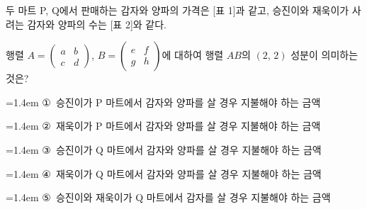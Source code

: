 \hspace*{2mm}\begin{minipage}[t]{\dimexpr\linewidth-2mm\relax}\vspace{0pt}
두 마트 P, Q에서 판매하는 감자와 양파의 가격은 [표 1]과 같고, 승진이와 재욱이가 사려는 감자와 양파의 수는 [표 2]와 같다. \par\smallskip\dispeq{}\par\smallskip\noindent 행렬 $A=\begin{pmatrix} a & b \\ c & d \end{pmatrix}$, $B=\begin{pmatrix} e & f \\ g & h \end{pmatrix}$에 대하여 행렬 $AB$의 $(2,\,2)$ 성분이 의미하는 것은?
\par\medskip\par\noindent\hangindent=1.4em {\small ①}\ 승진이가 P 마트에서 감자와 양파를 살 경우 지불해야 하는 금액\par\noindent\hangindent=1.4em {\small ②}\ 재욱이가 P 마트에서 감자와 양파를 살 경우 지불해야 하는 금액\par\noindent\hangindent=1.4em {\small ③}\ 승진이가 Q 마트에서 감자와 양파를 살 경우 지불해야 하는 금액\par\noindent\hangindent=1.4em {\small ④}\ 재욱이가 Q 마트에서 감자와 양파를 살 경우 지불해야 하는 금액\par\noindent\hangindent=1.4em {\small ⑤}\ 승진이와 재욱이가 Q 마트에서 감자를 살 경우 지불해야 하는 금액\par\medskip\end{minipage}
